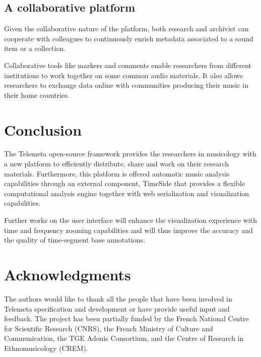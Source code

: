 \documentclass{paper}
\begin{document}
\subsection{A collaborative platform}
Given the collaborative nature of the platform, both research and archivist can cooperate with colleagues to continuously enrich metadata associated to a sound item or a collection.  

Collaborative tools like markers and comments enable researchers from different institutions to work together on some common audio materials.
It also allows researchers to exchange data online with communities producing their music in their home countries.


\section{Conclusion}

The Telemeta open-source framework provides the researchers in musicology with a new platform to efficiently distribute, share and work on their research materials. Furthermore, this platform is offered automatic music analysis capabilities through an external component, TimeSide that provides a flexible computational analysis engine together with web serialization and visualization capabilities.

Further works on the user interface will enhance the visualization experience with time and frequency zooming capabilities and will thus improve the accuracy and the quality of time-segment base annotations.



\section*{Acknowledgments} 
{\small The authors would like to thank all the people that have been involved in Telemeta specification and development or have provide useful input and feedback. 
The project has been partially funded by the French National Centre for Scientific Research (CNRS), the French Ministry of Culture and Communication, the TGE Adonis Consortium, and the Centre of Research in Ethnomusicology (CREM).}


%

\end{document}
